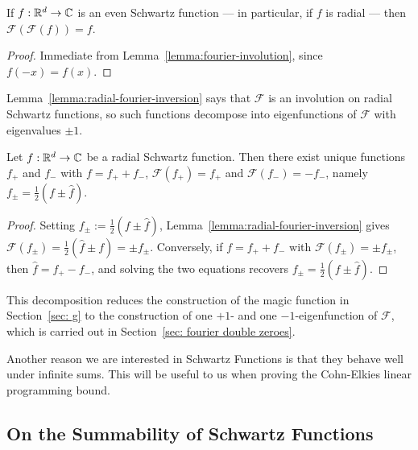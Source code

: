 \begin{lemma}\label{lemma:radial-fourier-inversion}\leanok
  If $f : \mathbb{R}^d \to \mathbb{C}$ is an even Schwartz function --- in particular, if $f$ is radial --- then $\mathcal{F}(\mathcal{F}(f)) = f$.
\end{lemma}
\begin{proof}\leanok
  Immediate from Lemma~\ref{lemma:fourier-involution}, since $f(-x) = f(x)$.
\end{proof}

Lemma~\ref{lemma:radial-fourier-inversion} says that $\mathcal{F}$ is an involution on radial Schwartz functions, so such functions decompose into eigenfunctions of $\mathcal{F}$ with eigenvalues $\pm 1$.

\begin{lemma}\label{lemma:eigenfunction-decomposition}
  Let $f : \mathbb{R}^d \to \mathbb{C}$ be a radial Schwartz function. Then there exist unique functions $f_+$ and $f_-$ with $f = f_+ + f_-$, $\mathcal{F}(f_+) = f_+$ and $\mathcal{F}(f_-) = -f_-$, namely $f_\pm = \frac12 (f \pm \widehat{f})$.
\end{lemma}
\begin{proof}
  Setting $f_\pm := \frac12(f \pm \widehat{f})$, Lemma~\ref{lemma:radial-fourier-inversion} gives $\mathcal{F}(f_\pm) = \frac12(\widehat{f} \pm f) = \pm f_\pm$. Conversely, if $f = f_+ + f_-$ with $\mathcal{F}(f_\pm) = \pm f_\pm$, then $\widehat{f} = f_+ - f_-$, and solving the two equations recovers $f_\pm = \frac12(f \pm \widehat{f})$.
\end{proof}

This decomposition reduces the construction of the magic function in Section~\ref{sec: g} to the construction of one $+1$- and one $-1$-eigenfunction of $\mathcal{F}$, which is carried out in Section~\ref{sec: fourier double zeroes}.

Another reason we are interested in Schwartz Functions is that they behave well under infinite sums. This will be useful to us when proving the Cohn-Elkies linear programming bound.

\subsection{On the Summability of Schwartz Functions}

